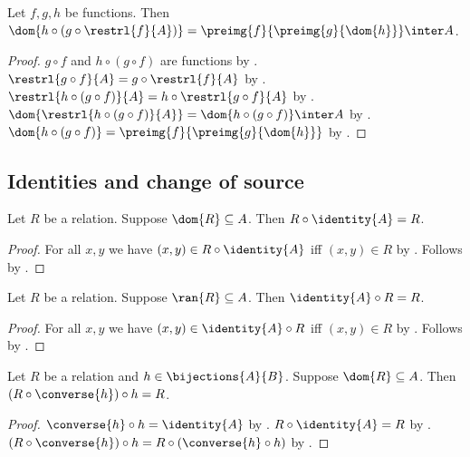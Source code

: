 \begin{theorem}\label{restricted_threefold_partial_composition_domain}
    Let $f,g,h$ be functions.
    Then $\dom{h\circ(g\circ\restrl{f}{A})}
        =\preimg{f}{\preimg{g}{\dom{h}}}\inter A$.
\end{theorem}
\begin{proof}
    $g\circ f$ and $h\circ(g\circ f)$ are functions by
        .
    $\restrl{g\circ f}{A}=g\circ\restrl{f}{A}$ by
        .
    $\restrl{h\circ(g\circ f)}{A}
        =h\circ\restrl{g\circ f}{A}$ by .
    $\dom{\restrl{h\circ(g\circ f)}{A}}
        =\dom{h\circ(g\circ f)}\inter A$ by
        .
    $\dom{h\circ(g\circ f)}
        =\preimg{f}{\preimg{g}{\dom{h}}}$ by
        .
\end{proof}

\subsection{Identities and change of source}

\begin{theorem}\label{relation_circ_identity}
    Let $R$ be a relation.
    Suppose $\dom{R}\subseteq A$.
    Then $R\circ\identity{A}=R$.
\end{theorem}
\begin{proof}
    For all $x,y$ we have $(x,y)\in R\circ\identity{A}$ iff $(x,y)\in R$ by
        .
    Follows by .
\end{proof}

\begin{theorem}\label{relation_identity_circ}
    Let $R$ be a relation.
    Suppose $\ran{R}\subseteq A$.
    Then $\identity{A}\circ R=R$.
\end{theorem}
\begin{proof}
    For all $x,y$ we have $(x,y)\in\identity{A}\circ R$ iff $(x,y)\in R$ by
        .
    Follows by .
\end{proof}

\begin{theorem}\label{composition_bijection_roundtrip}
    Let $R$ be a relation and $h\in\bijections{A}{B}$.
    Suppose $\dom{R}\subseteq A$.
    Then $(R\circ\converse{h})\circ h=R$.
\end{theorem}
\begin{proof}
    $\converse{h}\circ h=\identity{A}$ by .
    $R\circ\identity{A}=R$ by .
    $(R\circ\converse{h})\circ h=R\circ(\converse{h}\circ h)$ by .
\end{proof}

